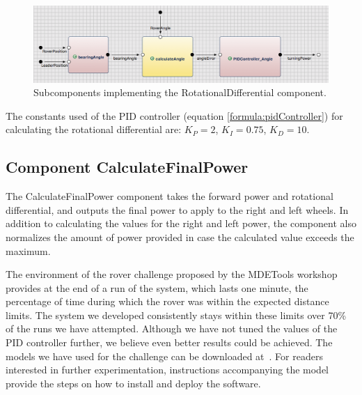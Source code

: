 \begin{figure}[!h]
	\centering
	\includegraphics[width=1\textwidth]{images/rotation.png}
	\caption{Subcomponents implementing the RotationalDifferential component.}
	\label{fig:rotation}
\end{figure}

The constants used of the PID controller (equation
\ref{formula:pidController}) for calculating the rotational differential are:
$K_P = 2$, $K_I=0.75$, $K_D=10$.

\subsection{Component CalculateFinalPower}
The \textsf{CalculateFinalPower} component takes the forward power and rotational differential, and outputs the final power to apply to the
right and left wheels.
In addition to calculating the values for the right and left power, the
component also normalizes the amount of power provided in case the calculated
value exceeds the maximum.

The environment of the rover challenge proposed by the MDETools workshop
provides at the end of a run of the system, which lasts one minute, the percentage of time during which the rover was within the
expected distance limits. The system we developed consistently
stays within these limits over 70\% of the runs we have attempted. Although we
have not tuned the values of the PID controller further, we believe even better results could be achieved.
The \af models we have used for the challenge can be downloaded
at~\cite{af3_mdetools}. For readers interested in further experimentation,
instructions accompanying the model provide the steps on how to install and
deploy the software.
